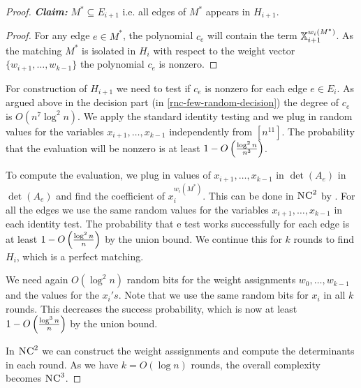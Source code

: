 \begin{proof}
\textbf{\textit{Claim:} }$M^*\subseteq E_{i+1}$ i.e. all edges of $M^*$ appears in $H_{i+1}$. 

\begin{proof}
	For any edge $e\in M^*$, the polynomial $c_e$ will contain the term $\mathbb{X}_{i+1}^{w_i(M^*)}$. As the matching $M^*$ is isolated in $H_i$ with respect to the weight vector $\{w_{i+1},\dots, w_{k-1}\}$ the polynomial $c_e$ is nonzero.
\end{proof}\parinn

For construction of $H_{i+1}$ we need to test if $c_e$ is nonzero for each edge $e\in E_i$. As argued above in the decision part (in \autoref{rnc-few-random-decision}) the degree of $c_e$ is $O(n^7\log^2n)$. We apply the standard identity testing  and we plug in random values for the variables $x_{i+1},\dots, x_{k-1}$ independently from $[n^{11}]$. The probability that the evaluation will be nonzero is at least $1-O\left( \frac{\log^2n }{n^3} \right)$. 

To compute the evaluation, we plug in values of $x_{i+1},\dots, x_{k-1}$ in $\det(A_e)$ in $\det(A_e)$ and find the coefficient of $x_i^{w_i(M^*)}$. This can be done in $\textsc{NC}^2$ by \cite[Corollary 4.4]{BorodinCookPippenger_1983_Pcf}. For all the edges we use the same random values for the variables $x_{i+1},\dots, x_{k-1}$ in each identity test. The probability that e test works successfully for each edge is at least $1-O\left( \frac{\log^2n}{n}\right)$ by the union bound. We continue this for $k$ rounds to find $H_i$, which is a perfect matching. 


We need again $O(\log^2 n)$ random bits for the weight assignments $w_0,\dots, w_{k-1}$ and the values for the $x_i's$. Note that we use the same random bits for $x_i$ in all $k$ rounds. This decreases the success probability, which is now at least $1-O\left( \frac{\log^3n}{n} \right)$ by the union bound. 

In $\textsc{NC}^2$ we can construct the weight asssignments and compute the determinants in each round. As we have $k=O(\log n)$ rounds, the overall complexity becomes $\textsc{NC}^3$.

\end{proof}